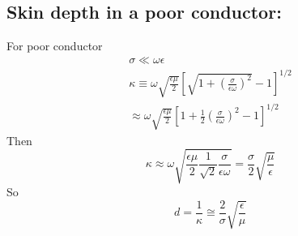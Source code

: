\subsection{ Skin depth in a poor conductor:}
For poor conductor
$$
\begin{gathered}
\sigma \ll \omega \epsilon \\
\kappa \equiv \omega \sqrt{\frac{\epsilon \mu}{2}}\left[\sqrt{1+\left(\frac{\sigma}{\epsilon \omega}\right)^{2}}-1\right]^{1 / 2} \\
\approx \omega \sqrt{\frac{\epsilon \mu}{2}}\left[1+\frac{1}{2}\left(\frac{\sigma}{\epsilon \omega}\right)^{2}-1\right]^{1 / 2}
\end{gathered}
$$
Then
$$
\kappa \approx \omega \sqrt{\frac{\epsilon \mu}{2} \frac{1}{\sqrt{2}} \frac{\sigma}{\epsilon \omega}}=\frac{\sigma}{2} \sqrt{\frac{\mu}{\epsilon}}
$$
So
$$
d=\frac{1}{\kappa} \cong \frac{2}{\sigma} \sqrt{\frac{\epsilon}{\mu}}
$$
